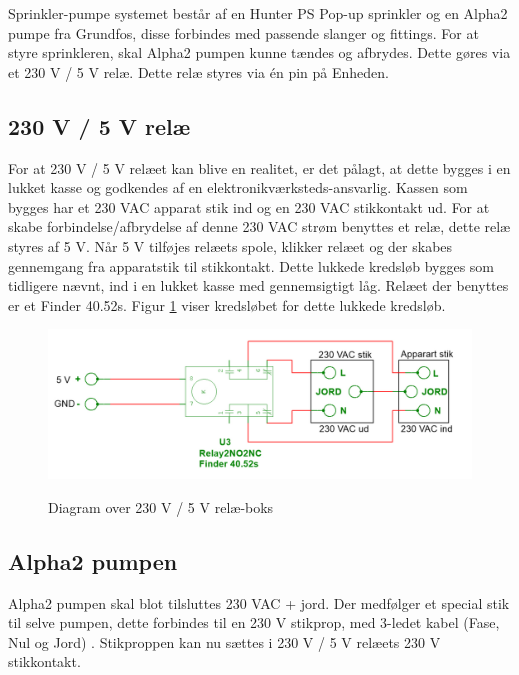 Sprinkler-pumpe systemet består af en Hunter PS Pop-up sprinkler og en Alpha2 pumpe fra Grundfos, disse forbindes med passende slanger og fittings. For at styre sprinkleren, skal Alpha2 pumpen kunne tændes og afbrydes. Dette gøres via et 230 V / 5 V relæ. Dette relæ styres via én pin på Enheden. 


\subsection{230 V / 5 V relæ}

For at 230 V / 5 V relæet kan blive en realitet, er det pålagt, at dette bygges i en lukket kasse og godkendes af en elektronikværksteds-ansvarlig. Kassen som bygges har et 230 VAC apparat stik ind og en 230 VAC stikkontakt ud. For at skabe forbindelse/afbrydelse af denne 230 VAC strøm benyttes et relæ, dette relæ styres af 5 V. Når 5 V  tilføjes relæets spole, klikker relæet og der skabes gennemgang fra apparatstik til stikkontakt. Dette lukkede kredsløb bygges som tidligere nævnt, ind i en lukket kasse med gennemsigtigt låg. Relæet der benyttes er et Finder 40.52s. Figur \ref{lab:RELAY} viser kredsløbet for dette lukkede kredsløb.

\begin{figure}[H] \centering
{\includegraphics[width=\textwidth]{filer/design/Billeder/230VAC_KREDS}}
\caption{Diagram over 230 V / 5 V relæ-boks}
\label{lab:RELAY}
\raggedright
\end{figure}

\subsection{Alpha2 pumpen}

Alpha2 pumpen skal blot tilsluttes 230 VAC + jord. Der medfølger et special stik til selve pumpen, dette forbindes til en 230 V stikprop, med 3-ledet kabel (Fase, Nul og Jord) . Stikproppen kan nu sættes i 230 V / 5 V relæets 230 V stikkontakt.


